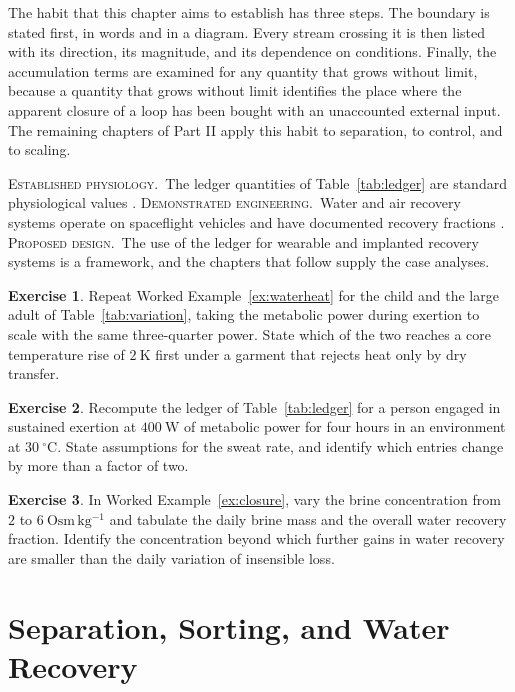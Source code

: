 \documentclass[11pt,openany]{book}
\theoremstyle{definition}
\newtheorem{exercise}{Exercise}[chapter]
\theoremstyle{remark}
\newcommand{\est}{\textsc{Established physiology.}\ }
\newcommand{\dem}{\textsc{Demonstrated engineering.}\ }
\newcommand{\pro}{\textsc{Proposed design.}\ }
\begin{document}
The habit that this chapter aims to establish has three steps. The boundary is stated first, in words and in a diagram. Every stream crossing it is then listed with its direction, its magnitude, and its dependence on conditions. Finally, the accumulation terms are examined for any quantity that grows without limit, because a quantity that grows without limit identifies the place where the apparent closure of a loop has been bought with an unaccounted external input. The remaining chapters of Part II apply this habit to separation, to control, and to scaling.

\begin{evidence}
\est The ledger quantities of Table~\ref{tab:ledger} are standard physiological values \cite{guyton2021,boron2017}. \dem Water and air recovery systems operate on spaceflight vehicles and have documented recovery fractions \cite{eckart1996}. \pro The use of the ledger for wearable and implanted recovery systems is a framework, and the chapters that follow supply the case analyses.
\end{evidence}

\begin{exercise}
Repeat Worked Example~\ref{ex:waterheat} for the child and the large adult of Table~\ref{tab:variation}, taking the metabolic power during exertion to scale with the same three-quarter power. State which of the two reaches a core temperature rise of $2\ \mathrm{K}$ first under a garment that rejects heat only by dry transfer.
\end{exercise}

\begin{exercise}
Recompute the ledger of Table~\ref{tab:ledger} for a person engaged in sustained exertion at $400\ \mathrm{W}$ of metabolic power for four hours in an environment at $30\ ^\circ\mathrm{C}$. State assumptions for the sweat rate, and identify which entries change by more than a factor of two.
\end{exercise}

\begin{exercise}
In Worked Example~\ref{ex:closure}, vary the brine concentration from $2$ to $6\ \mathrm{Osm\,kg^{-1}}$ and tabulate the daily brine mass and the overall water recovery fraction. Identify the concentration beyond which further gains in water recovery are smaller than the daily variation of insensible loss.
\end{exercise}

\chapter{Separation, Sorting, and Water Recovery}
\label{ch:separation}
\end{document}
